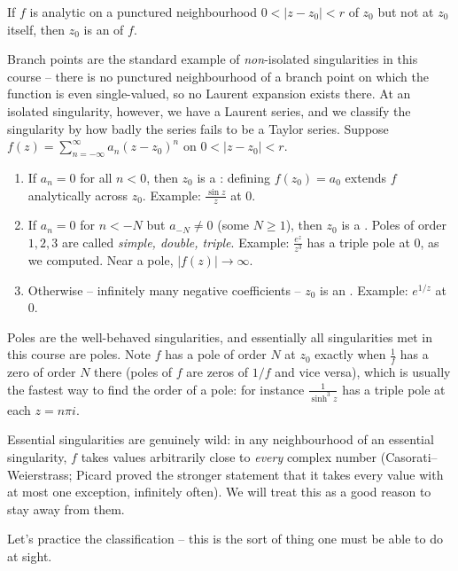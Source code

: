 \begin{definition}
	If $f$ is analytic on a punctured neighbourhood $0 < |z - z_0| < r$ of $z_0$ but not at $z_0$ itself, then $z_0$ is an  of $f$.
\end{definition}

Branch points are the standard example of \emph{non}-isolated singularities in this course -- there is no punctured neighbourhood of a branch point on which the function is even single-valued, so no Laurent expansion exists there. At an isolated singularity, however, we have a Laurent series, and we classify the singularity by how badly the series fails to be a Taylor series. Suppose $f(z) = \sum_{n=-\infty}^{\infty} a_n (z - z_0)^n$ on $0 < |z - z_0| < r$.

\begin{enumerate}[label=(\roman*)]
	\item If $a_n = 0$ for all $n < 0$, then $z_0$ is a : defining $f(z_0) = a_0$ extends $f$ analytically across $z_0$. Example: $\frac{\sin z}{z}$ at $0$.
	\item If $a_n = 0$ for $n < -N$ but $a_{-N} \neq 0$ (some $N \geq 1$), then $z_0$ is a . Poles of order $1, 2, 3$ are called \emph{simple, double, triple}. Example: $\frac{e^z}{z^3}$ has a triple pole at $0$, as we computed. Near a pole, $|f(z)| \to \infty$.
	\item Otherwise -- infinitely many negative coefficients -- $z_0$ is an . Example: $e^{1/z}$ at $0$.
\end{enumerate}

Poles are the well-behaved singularities, and essentially all singularities met in this course are poles. Note $f$ has a pole of order $N$ at $z_0$ exactly when $\frac{1}{f}$ has a zero of order $N$ there (poles of $f$ are zeros of $1/f$ and vice versa), which is usually the fastest way to find the order of a pole: for instance $\frac{1}{\sinh^3 z}$ has a triple pole at each $z = n\pi i$.

Essential singularities are genuinely wild: in any neighbourhood of an essential singularity, $f$ takes values arbitrarily close to \emph{every} complex number (Casorati--Weierstrass; Picard proved the stronger statement that it takes every value with at most one exception, infinitely often). We will treat this as a good reason to stay away from them.

Let's practice the classification -- this is the sort of thing one must be able to do at sight.

